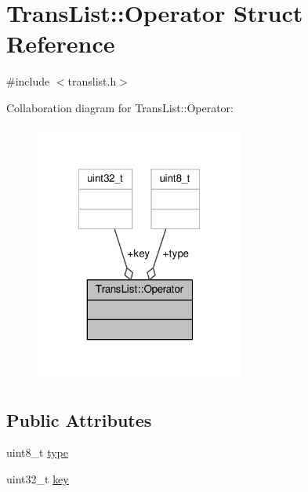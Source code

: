 \hypertarget{structTransList_1_1Operator}{\section{Trans\-List\-:\-:Operator Struct Reference}
\label{structTransList_1_1Operator}
}


{\ttfamily \#include $<$translist.\-h$>$}



Collaboration diagram for Trans\-List\-:\-:Operator\-:
\nopagebreak
\begin{figure}[H]
\begin{center}
\leavevmode
\includegraphics[width=195pt]{structTransList_1_1Operator__coll__graph}
\end{center}
\end{figure}
\subsection*{Public Attributes}
\begin{DoxyCompactItemize}
\item 
uint8\-\_\-t \hyperlink{structTransList_1_1Operator_a146e148ecc1dc28194c660e5867bdd47}{type}
\item 
uint32\-\_\-t \hyperlink{structTransList_1_1Operator_a4dd818b67d2937304af998ab952868f6}{key}
\end{DoxyCompactItemize}


